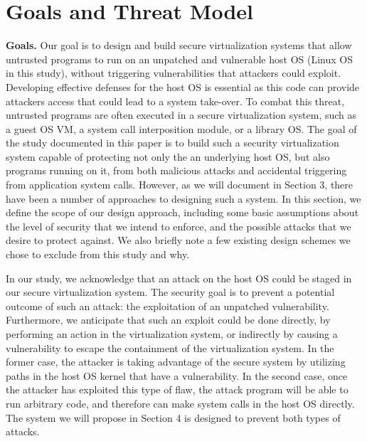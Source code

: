 \section{Goals and Threat Model}
\label{sec.motivation-and-background}

\textbf{Goals.}
Our goal is to design and build secure virtualization systems that allow
untrusted programs to run on an unpatched and vulnerable host OS (Linux OS in
 this study), without triggering vulnerabilities that attackers could exploit.
 Developing effective defenses for the host OS is essential as this code
 can provide attackers access that could lead to a system take-over.
To combat this threat, untrusted programs are often executed in a secure
 virtualization system, such as a guest OS VM, a system call interposition
 module, or a library OS. The goal of the study documented in this paper is to
build such a security virtualization system capable of protecting not only the
an underlying host OS, but also programs running on it, from both malicious attacks
and accidental triggering from application system calls. However, as we will document
 in Section 3, there have been a number of approaches to designing such a system.
In this section, we define the scope of our design approach, including some basic
assumptions about the level of security that we intend to enforce,
and the possible attacks that we desire to protect against. We also briefly note
a few existing design schemes we chose to exclude from this study and why.

In our study, we acknowledge that an attack on the host OS could be staged in our secure
virtualization system. The security goal is to prevent a potential outcome of such
an attack: the exploitation of an unpatched vulnerability. Furthermore, we
anticipate that such an exploit could be done directly, by performing an action in the
virtualization system, or indirectly by causing a vulnerability to escape the
containment of the virtualization system.  In the former case, the attacker is
taking advantage of the secure system by utilizing paths in the host OS kernel
that have a vulnerability. In the second case, once the attacker has exploited
this type of flaw, the attack program will be able to run arbitrary code, and
therefore can make system calls in the host OS directly. The system we will propose
in Section 4 is designed to prevent both types of attacks.

